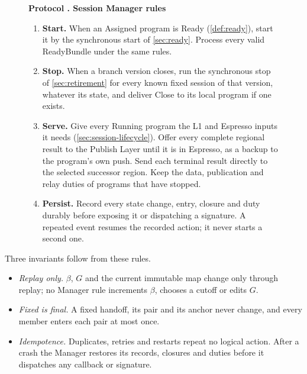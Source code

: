\documentclass[11pt,a4paper]{article}
\newcommand{\tagg}[1]{\ensuremath{\mathsf{#1}}}
\newcounter{protocol}
\newenvironment{protocol}[3][htbp]{\begin{figure}[#1]\refstepcounter{protocol}\label{#2}
\begin{mdframed}[linewidth=.6pt,skipabove=0pt,skipbelow=0pt,
innertopmargin=7pt,innerbottommargin=7pt]\small
\textbf{Protocol \theprotocol. #3}\par\smallskip}{\end{mdframed}\end{figure}}
\begin{document}
\begin{protocol}[H]{alg:rotation}{Session Manager rules}
\begin{enumerate}[label=\textbf{\arabic*)},itemsep=3pt]
\begin{enumerate}[label=(\alph*),itemsep=2pt]
 \end{enumerate}
 In both cases the authority is $\tagg{AUTH}_{r',0}$ of the target turn
 index $r'$, and $\lambda^{\rm open}$ is the larger of the anchor's L1
 reference height and that authority's publication height. Verify the
 handoff with \tagg{VerifyHandoffHistory} (\cref{sec:verify-handoff})
 and record it in the program table. Each pair is assigned at most once;
 a different handoff for an assigned pair is rejected. The genesis
 session is assigned when $\mathcal V_G$ has
 $\mathsf{Tail}=\tagg{NEXT}(\nu)$ with cause \tagg{GENESIS} and
 $i(\nu)$ equal to the node's region. A
 verified ReadyBundle for a pair the node has not yet assigned assigns
 it in the same way and then enters at once (\cref{sec:ready}).
\item \textbf{Start.} When an Assigned program is Ready
(\cref{def:ready}), start it by the synchronous start of
\cref{sec:ready}. Process every valid ReadyBundle under the same rules.
\item \textbf{Stop.} When a branch version closes, run the synchronous
stop of \cref{sec:retirement} for every known fixed session of that
version, whatever its state, and deliver Close to its local program if
one exists.
\item \textbf{Serve.} Give every Running program the L1 and Espresso
inputs it needs (\cref{sec:session-lifecycle}). Offer every complete
regional result to the Publish Layer until it is in Espresso, as a
backup to the program's own push. Send each terminal result directly to
the selected successor region. Keep the data, publication and relay
duties of programs that have stopped.
\item \textbf{Persist.} Record every state change, entry, closure and
duty durably before exposing it or dispatching a signature. A repeated
event resumes the recorded action; it never starts a second one.
\end{enumerate}
\end{protocol}

Three invariants follow from these rules.
\begin{itemize}
\item \emph{Replay only.} $\beta$, $G$ and the current immutable map
change only through replay; no Manager rule increments $\beta$, chooses
a cutoff or edits $G$.
\item \emph{Fixed is final.} A fixed handoff, its pair and its anchor
never change, and every member enters each pair at most once.
\item \emph{Idempotence.} Duplicates, retries and restarts repeat no
logical action. After a crash the Manager restores its records,
closures and duties before it dispatches any callback or signature.
\end{itemize}
\end{document}
